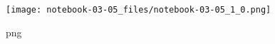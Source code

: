 \begin{figure}
\centering
\texttt{[image: notebook-03-05\_files/notebook-03-05\_1\_0.png]}
\caption{png}
\end{figure}


